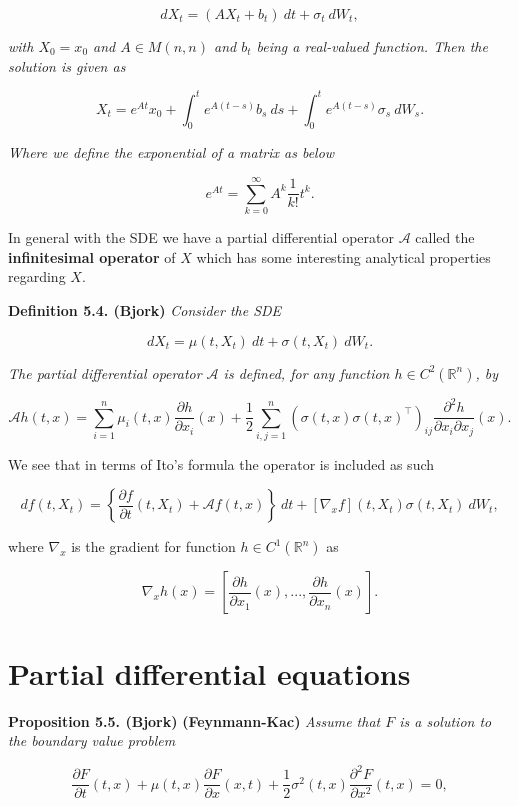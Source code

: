 \documentclass[a4paper,12pt,openany]{book}
\begin{document}
\[
dX_t=(A X_t + b_t)\ dt+ \sigma_t\ dW_t,\tag{5.19}
\]

\emph{with \(X_0=x_0\) and \(A\in M(n,n)\) and \(b_t\) being a real-valued function. Then the solution is given as}

\[
X_t=e^{At}x_0+\int_0^te^{A(t-s)}b_s\ ds+\int_0^te^{A(t-s)}\sigma_s\ dW_s.\tag{5.20}
\]

\emph{Where we define the exponential of a matrix as below}

\[
e^{At}=\sum_{k=0}^\infty A^k\frac{1}{k!}t^k.
\]

In general with the SDE we have a partial differential operator \(\mathcal{A}\) called the \textbf{infinitesimal operator} of \(X\) which has some interesting analytical properties regarding \(X\).

\textbf{Definition 5.4. (Bjork)} \emph{Consider the SDE}

\[
dX_t=\mu(t,X_t)\ dt+\sigma(t,X_t)\ dW_t.\tag{5.21}
\]

\emph{The partial differential operator \(\mathcal{A}\) is defined, for any function \(h\in C^2(\mathbb{R}^n)\), by}

\[
\mathcal{A}h(t,x)=\sum_{i=1}^n\mu_i(t,x)\frac{\partial h}{\partial x_i}(x) + \frac{1}{2}\sum_{i,j=1}^n (\sigma(t,x)\sigma(t,x)^\top)_{ij}\frac{\partial^2h}{\partial x_i\partial x_j}(x).
\]

We see that in terms of Ito's formula the operator is included as such

\[
df(t,X_t)=\left\{\frac{\partial f}{\partial t}(t,X_t)+\mathcal{A}f(t,x)\right\}\ dt+[\nabla_xf](t,X_t)\sigma(t,X_t)\ dW_t,
\]

where \(\nabla_x\) is the gradient for function \(h\in C^1(\mathbb{R}^n)\) as

\[
\nabla_xh(x)=\left[\frac{\partial h}{\partial x_1}(x),...,\frac{\partial h}{\partial x_n}(x)\right].
\]

\hypertarget{partial-differential-equations}{%
\section{Partial differential equations}\label{partial-differential-equations}}

\textbf{Proposition 5.5. (Bjork)} \textbf{(Feynmann-Kac)} \emph{Assume that \(F\) is a solution to the boundary value problem}

\[
\frac{\partial F}{\partial t}(t,x)+\mu(t,x)\frac{\partial F}{\partial x}(x,t)+\frac{1}{2}\sigma^2(t,x)\frac{\partial^2 F}{\partial x^2}(t,x)=0,
\]
\end{document}
